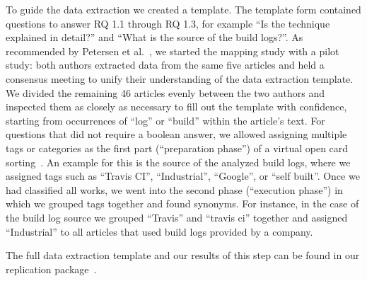 To guide the data extraction we created a template.
The template form contained questions to answer RQ 1.1 through RQ 1.3,
for example ``Is the technique explained in detail?'' and
``What is the source of the build logs?''.
As recommended by Petersen et
al.~\cite{petersen2015guidelines}, we started the mapping study with a
pilot study:
both authors extracted data from the same five articles and held a
consensus meeting to unify their understanding
of the data extraction template.
We divided the remaining 46 articles evenly between the two authors
and inspected them as closely as necessary to fill out the template
with confidence,
starting from occurrences of ``log'' or ``build'' within the article's
text.
For questions that did not require a boolean answer, we allowed assigning
multiple tags or categories as the first part (``preparation phase'')
of a virtual open card sorting~\cite{zimmermann2016card}.
An example for this is the source of the analyzed build logs,
where we assigned tags such as ``Travis CI'',
``Industrial'', ``Google'', or
``self built''.
Once we had classified all works, we went into the second phase
(``execution phase'') in which we grouped tags
together and found synonyms.
For instance, in the case of the build log source we grouped
``Travis'' and ``travis ci'' together and assigned ``Industrial'' to
all articles that used build logs provided by a company.

The full data extraction template and our results of this step can be
found in our replication package~\cite{brandt2020chunk-replication}.


